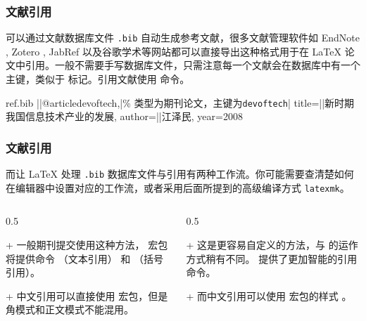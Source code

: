\begin{frame}[fragile]
  \frametitle{文献引用}
  可以通过文献数据库文件 \texttt{.bib} 自动生成参考文献，很多文献管理软件如 EndNote , Zotero , JabRef  以及谷歌学术等网站都可以直接导出这种格式用于在 \LaTeX{} 论文中引用。一般不需要手写数据库文件，只需注意每一个文献会在数据库中有一个主键，类似于  标记。引用文献使用  命令。

  \begin{codeblock}[]{ref.bib}
|\highlightline|@article{devoftech,|\hfill\alert{\% 类型为期刊论文，主键为\texttt{devoftech}}|
  title={|\phantom{}|新时期我国信息技术产业的发展},
  author={|\phantom{}|江泽民},
  year={2008}
}
  \end{codeblock}
\end{frame}

\begin{frame}
  \frametitle{文献引用}
  而让 \LaTeX{} 处理 \texttt{.bib} 数据库文件与引用有两种工作流。你可能需要查清楚如何在编辑器中设置对应的工作流，或者采用后面所提到的高级编译方式 \texttt{latexmk}。
  \begin{columns}
    \begin{column}{0.5\textwidth}
      \begin{block}{ + }
        一般期刊提交使用这种方法， 宏包将提供命令 （文本引用） 和 （括号引用）。
      \end{block}
      \begin{alertblock}{ + }
        中文引用可以直接使用  宏包，但是角模式和正文模式不能混用。
      \end{alertblock}
    \end{column}
    \begin{column}{0.5\textwidth}
      \begin{block}{ + }
        这是更容易自定义的方法，与  的运作方式稍有不同。 提供了更加智能的引用命令。
      \end{block}
      \begin{alertblock}{ + }
        而中文引用可以使用  宏包的样式 。
      \end{alertblock}
    \end{column}
  \end{columns}
\end{frame}

